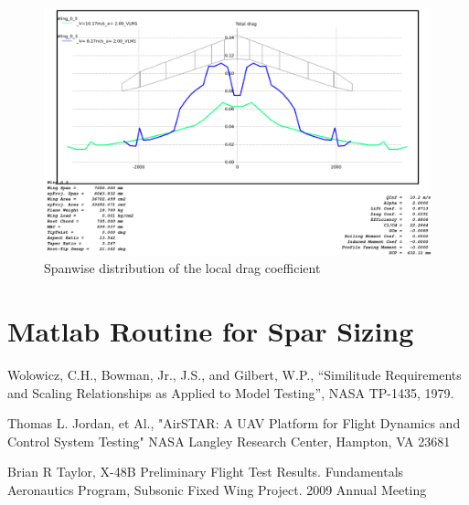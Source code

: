 \documentclass[titlepage,10pt]{article}
\begin{document}
\begin{figure}[h]
\begin{center}
\includegraphics[width=120mm]{XFLR_spandrag_stall.png}
\end{center}
\caption{Spanwise distribution of the local drag coefficient}
\label{fig:tcdrag}
\end{figure}

\clearpage

\newpage
\section{Matlab Routine for Spar Sizing}
\label{app:sparsizing}

\newpage
\begin{thebibliography}{9}

   Wolowicz, C.H., Bowman, Jr., J.S., and Gilbert, W.P.,
   “Similitude Requirements and Scaling Relationships as Applied to Model Testing”, 
   NASA TP-1435, 1979.

	Thomas L. Jordan, et Al.,
	"AirSTAR: A UAV Platform for Flight Dynamics and Control System Testing"
	NASA Langley Research Center, Hampton, VA 23681

	Brian R Taylor,
	X-48B Preliminary Flight Test Results.
	Fundamentals Aeronautics Program, Subsonic Fixed Wing Project.
	2009 Annual Meeting


\end{thebibliography}
\end{document}
